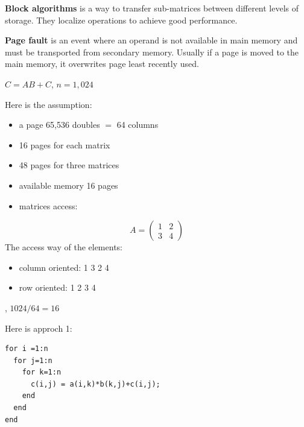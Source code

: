 \begin{definition}
    \textbf{Block algorithms} is a way to transfer sub-matrices between different levels of storage. They localize operations to achieve good performance.
\end{definition}


\begin{definition}
    \textbf{Page fault} is an event where an operand is not available in main memory and must be transported from secondary memory. Usually if a page is moved to the main memory, it overwrites page least recently used.
\end{definition}

\begin{eg}
    $C = AB + C$, $n = 1,024$
\end{eg}

Here is the assumption:
\begin{itemize}
    \item a page 65,536 doubles $=$ 64 columns
    \item 16 pages for each matrix
    \item 48 pages for three matrices
    \item available memory 16 pages
    \item matrices access: 
\end{itemize}

\begin{note}
    \[
        A = 
        \begin{pmatrix}
            1 & 2 \\
            3 & 4
        \end{pmatrix}
    \]
    The access way of the elements:
    \begin{itemize}
        \item column oriented: 1 3 2 4
        \item row oriented: 1 2 3 4
    \end{itemize}
\end{note}
\vspace{1em}

, $1024/64 = 16$

\begin{eg}
    Here is approch 1:
\end{eg}
\begin{verbatim}
for i =1:n
  for j=1:n
    for k=1:n
      c(i,j) = a(i,k)*b(k,j)+c(i,j);
    end
  end
end
\end{verbatim}

